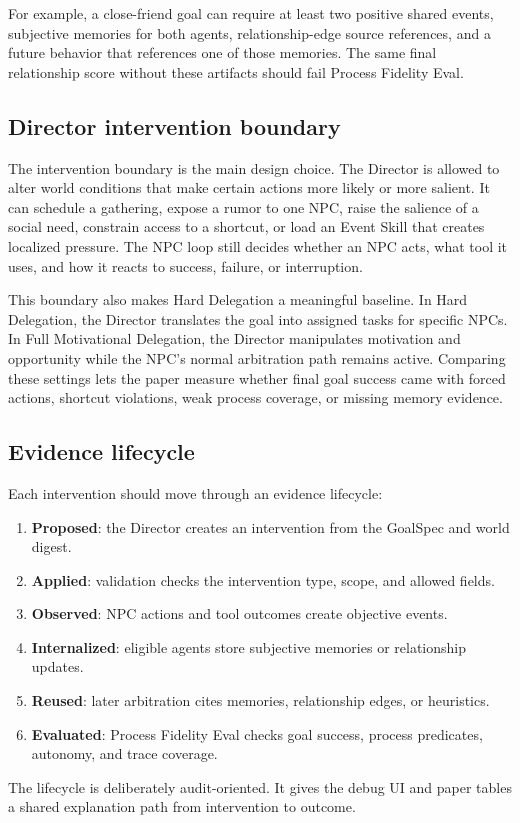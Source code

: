 For example, a close-friend goal can require at least two positive shared events, subjective memories for both agents, relationship-edge source references, and a future behavior that references one of those memories. The same final relationship score without these artifacts should fail Process Fidelity Eval.

\subsection{Director intervention boundary}

The intervention boundary is the main design choice. The Director is allowed to alter world conditions that make certain actions more likely or more salient. It can schedule a gathering, expose a rumor to one NPC, raise the salience of a social need, constrain access to a shortcut, or load an Event Skill that creates localized pressure. The NPC loop still decides whether an NPC acts, what tool it uses, and how it reacts to success, failure, or interruption.

This boundary also makes Hard Delegation a meaningful baseline. In Hard Delegation, the Director translates the goal into assigned tasks for specific NPCs. In Full Motivational Delegation, the Director manipulates motivation and opportunity while the NPC's normal arbitration path remains active. Comparing these settings lets the paper measure whether final goal success came with forced actions, shortcut violations, weak process coverage, or missing memory evidence.

\subsection{Evidence lifecycle}

Each intervention should move through an evidence lifecycle:

\begin{enumerate}
  \item \textbf{Proposed}: the Director creates an intervention from the GoalSpec and world digest.
  \item \textbf{Applied}: validation checks the intervention type, scope, and allowed fields.
  \item \textbf{Observed}: NPC actions and tool outcomes create objective events.
  \item \textbf{Internalized}: eligible agents store subjective memories or relationship updates.
  \item \textbf{Reused}: later arbitration cites memories, relationship edges, or heuristics.
  \item \textbf{Evaluated}: Process Fidelity Eval checks goal success, process predicates, autonomy, and trace coverage.
\end{enumerate}

The lifecycle is deliberately audit-oriented. It gives the debug UI and paper tables a shared explanation path from intervention to outcome.
